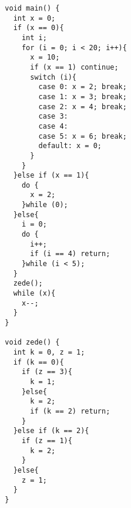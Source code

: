 \documentclass{article}
\begin{document}
  \begin{lstlisting}
  void main() {
    int x = 0;
    if (x == 0){
      int i;
      for (i = 0; i < 20; i++){
        x = 10;
        if (x == 1) continue;
        switch (i){
          case 0: x = 2; break;
          case 1: x = 3; break;
          case 2: x = 4; break;
          case 3:
          case 4:
          case 5: x = 6; break;
          default: x = 0;
        }
      }
    }else if (x == 1){
      do {
        x = 2;
      }while (0);
    }else{
      i = 0;
      do {
        i++;
        if (i == 4) return;
      }while (i < 5);
    }
    zede();
    while (x){
      x--;
    }
  }

  void zede() {
    int k = 0, z = 1;
    if (k == 0){
      if (z == 3){
        k = 1;
      }else{
        k = 2;
        if (k == 2) return;
      }
    }else if (k == 2){
      if (z == 1){
        k = 2;
      }
    }else{
      z = 1;
    }
  }
  \end{lstlisting}
\end{document}
